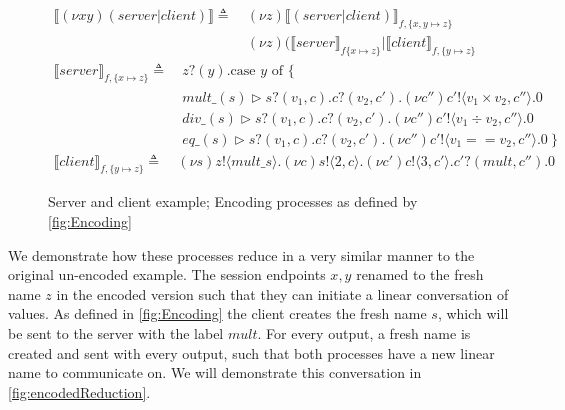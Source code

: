 \begin{figure}
    \centering
    \begin{align*}
        \llbracket (\nu xy)(server | client) \rrbracket \triangleq \:& (\nu z) \llbracket (server | client) \rrbracket_{f, \{x, y \mapsto z \}} \\
        & (\nu z) (\llbracket server \rrbracket_{f\{x \mapsto z \}} | \llbracket client \rrbracket_{f, \{y \mapsto z \}}
    \end{align*}
    \begin{align*}
        \llbracket server \rrbracket_{f, \{x \mapsto z\}} \triangleq \: & z?(y).\text{case } y \text{ of } \{ \\
        & mult\_(s) \vartriangleright s?(v_1, c).c?(v_2, c').(\nu c'')c'!\langle v_1 \times v_2, c'' \rangle.0 \\
        & div\_(s) \vartriangleright s?(v_1, c).c?(v_2, c').(\nu c'')c'!\langle v_1 \div v_2, c'' \rangle.0 \\
        & eq\_(s) \vartriangleright s?(v_1, c).c?(v_2, c').(\nu c'')c'!\langle v_1 == v_2, c'' \rangle.0 \:\}
    \end{align*}
    \begin{align*}
        \llbracket client \rrbracket_{f, \{y \mapsto z\}} \triangleq \: & (\nu s)z!\langle mult\_s \rangle.(\nu c)s!\langle 2, c \rangle.(\nu c')c!\langle 3, c' \rangle.c'?(mult, c'').0
    \end{align*}
    \caption{Server and client example; Encoding processes as defined by \autoref{fig:Encoding}}
    \label{fig:encodeExample}
\end{figure}

We demonstrate how these processes reduce in a very similar manner to the original un-encoded example. The session endpoints $x, y$ renamed to the fresh name $z$ in the encoded version such that they can initiate a linear conversation of values. As defined in \autoref{fig:Encoding} the client creates the fresh name $s$, which will be sent to the server with the label $mult$. For every output, a fresh name is created and sent with every output, such that both processes have a new linear name to communicate on. We will demonstrate this conversation in \autoref{fig:encodedReduction}. 

